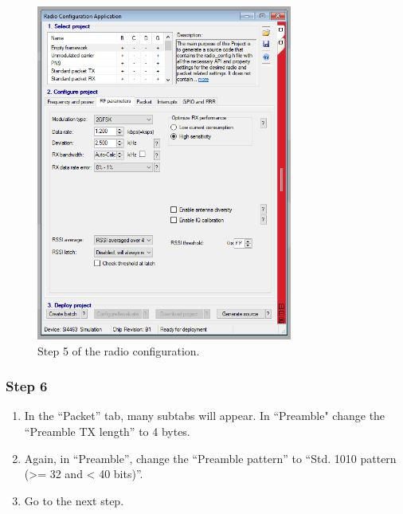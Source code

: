 \begin{figure}[!h]
	\begin{center}
		\includegraphics[width=0.75\textwidth]{figures/wds-tutorial/wds-tutorial-5.png}
		\caption{Step 5 of the radio configuration.}
		\label{fig:wds-tutorial-step-5}
	\end{center}
\end{figure}

\subsubsection{Step 6}

\begin{enumerate}
    \item In the ``Packet'' tab, many subtabs will appear. In ``Preamble" change the ``Preamble TX length'' to 4 bytes.
    \item Again, in ``Preamble'', change the ``Preamble pattern'' to ``Std. 1010 pattern (>= 32 and < 40 bits)''.
    \item Go to the next step.
\end{enumerate}

